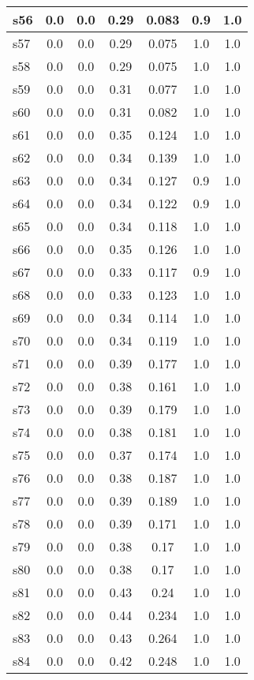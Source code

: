 \documentclass{article}
\begin{document}
\begin{tabular}{|l|c|c|c|c|c|c|}
\hline
s56 &0.0 & 0.0 & 0.29 & 0.083 & 0.9 & 1.0\\
\hline
s57 &0.0 & 0.0 & 0.29 & 0.075 & 1.0 & 1.0\\
\hline
s58 &0.0 & 0.0 & 0.29 & 0.075 & 1.0 & 1.0\\
\hline
s59 &0.0 & 0.0 & 0.31 & 0.077 & 1.0 & 1.0\\
\hline
s60 &0.0 & 0.0 & 0.31 & 0.082 & 1.0 & 1.0\\
\hline
s61 &0.0 & 0.0 & 0.35 & 0.124 & 1.0 & 1.0\\
\hline
s62 &0.0 & 0.0 & 0.34 & 0.139 & 1.0 & 1.0\\
\hline
s63 &0.0 & 0.0 & 0.34 & 0.127 & 0.9 & 1.0\\
\hline
s64 &0.0 & 0.0 & 0.34 & 0.122 & 0.9 & 1.0\\
\hline
s65 &0.0 & 0.0 & 0.34 & 0.118 & 1.0 & 1.0\\
\hline
s66 &0.0 & 0.0 & 0.35 & 0.126 & 1.0 & 1.0\\
\hline
s67 &0.0 & 0.0 & 0.33 & 0.117 & 0.9 & 1.0\\
\hline
s68 &0.0 & 0.0 & 0.33 & 0.123 & 1.0 & 1.0\\
\hline
s69 &0.0 & 0.0 & 0.34 & 0.114 & 1.0 & 1.0\\
\hline
s70 &0.0 & 0.0 & 0.34 & 0.119 & 1.0 & 1.0\\
\hline
s71 &0.0 & 0.0 & 0.39 & 0.177 & 1.0 & 1.0\\
\hline
s72 &0.0 & 0.0 & 0.38 & 0.161 & 1.0 & 1.0\\
\hline
s73 &0.0 & 0.0 & 0.39 & 0.179 & 1.0 & 1.0\\
\hline
s74 &0.0 & 0.0 & 0.38 & 0.181 & 1.0 & 1.0\\
\hline
s75 &0.0 & 0.0 & 0.37 & 0.174 & 1.0 & 1.0\\
\hline
s76 &0.0 & 0.0 & 0.38 & 0.187 & 1.0 & 1.0\\
\hline
s77 &0.0 & 0.0 & 0.39 & 0.189 & 1.0 & 1.0\\
\hline
s78 &0.0 & 0.0 & 0.39 & 0.171 & 1.0 & 1.0\\
\hline
s79 &0.0 & 0.0 & 0.38 & 0.17 & 1.0 & 1.0\\
\hline
s80 &0.0 & 0.0 & 0.38 & 0.17 & 1.0 & 1.0\\
\hline
s81 &0.0 & 0.0 & 0.43 & 0.24 & 1.0 & 1.0\\
\hline
s82 &0.0 & 0.0 & 0.44 & 0.234 & 1.0 & 1.0\\
\hline
s83 &0.0 & 0.0 & 0.43 & 0.264 & 1.0 & 1.0\\
\hline
s84 &0.0 & 0.0 & 0.42 & 0.248 & 1.0 & 1.0\\

\end{tabular}
\end{document}
